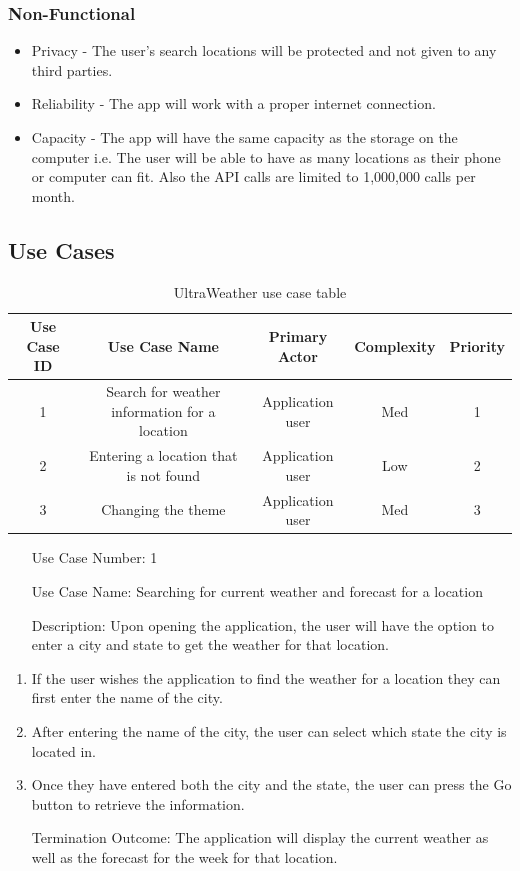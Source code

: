 \documentclass[10pt,conference,onecolumn,compsoc]{IEEEtran}
\begin{document}
\subsubsection{Non-Functional}
\begin{itemize}
\item Privacy - The user's search locations will be protected and not given to any third parties.
\item Reliability - The app will work with a proper internet connection.
\item Capacity - The app will have the same capacity as the storage on the computer i.e. The user will be able to have as many locations as their phone or computer can fit. Also the API calls are limited to 1,000,000 calls per month.
\end{itemize}

\subsection{Use Cases}


\begin{table}
\centering
\begin{tabular}{|c|c|c|c|c|}
\hline
Use Case ID & Use Case Name & Primary Actor & Complexity & Priority \\
\hline \hline
1 & Search for weather information for a location & Application user & Med & 1\\
\hline
2 & Entering a location that is not found & Application user & Low & 2\\
\hline
3 & Changing the theme & Application user & Med & 3\\
\hline

\end{tabular}
\caption{UltraWeather use case table}
\label{tab:useCaseIndex}
\end{table}

\begin{itemize}
\item[Use Case Number:] 1
\item[Use Case Name:] Searching for current weather and forecast for a location
\item[Description:] Upon opening the application, the user will have the option to enter a city and state to get the weather for that location.
\end{itemize}

\begin{enumerate}
\item If the user wishes the application to find the weather for a location they can first enter the name of the city.
\item After entering the name of the city, the user can select which state the city is located in.
\item Once they have entered both the city and the state, the user can press the Go button to retrieve the information.  
\item[Termination Outcome:] The application will display the current weather as well as the forecast for the week for that location.
\end{enumerate}
\end{document}
